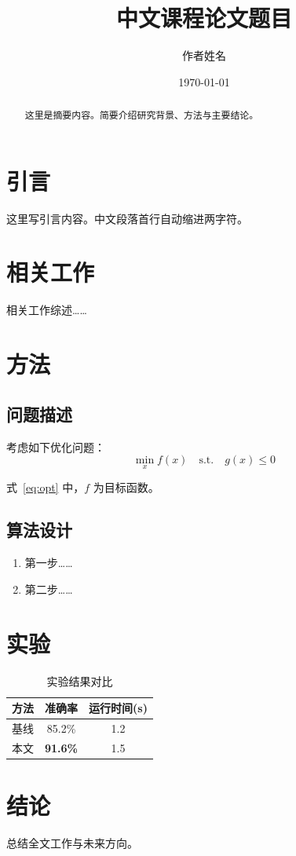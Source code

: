 \documentclass[UTF8,a4paper,12pt]{ctexart}
\title{中文课程论文题目}
\author{作者姓名}
\date{\today}
\begin{document}
\maketitle

\begin{abstract}
这里是摘要内容。简要介绍研究背景、方法与主要结论。
\end{abstract}

\section{引言}

这里写引言内容。中文段落首行自动缩进两字符。

\section{相关工作}

相关工作综述……

\section{方法}

\subsection{问题描述}

考虑如下优化问题：
\begin{equation}
  \min_{x} f(x) \quad \text{s.t.} \quad g(x) \leq 0
  \label{eq:opt}
\end{equation}

式~\eqref{eq:opt} 中，$f$ 为目标函数。

\subsection{算法设计}

\begin{enumerate}
  \item 第一步……
  \item 第二步……
\end{enumerate}

\section{实验}

\begin{table}[htbp]
  \centering
  \caption{实验结果对比}
  \label{tab:results}
  \begin{tabular}{lcc}
    \hline
    方法 & 准确率 & 运行时间(s) \\
    \hline
    基线 & 85.2\% & 1.2 \\
    本文 & \textbf{91.6\%} & 1.5 \\
    \hline
  \end{tabular}
\end{table}

\section{结论}

总结全文工作与未来方向。

% 
% 
\end{document}
